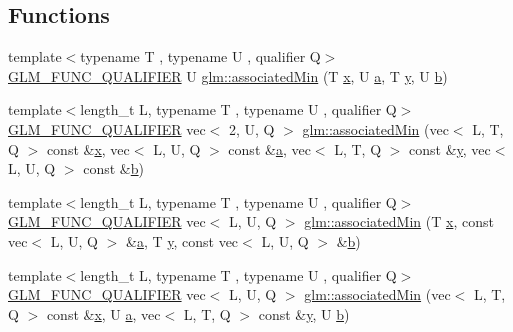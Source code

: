 \subsection*{Functions}
\begin{DoxyCompactItemize}
\item 
{\footnotesize template$<$typename T , typename U , qualifier Q$>$ }\\\hyperlink{setup_8hpp_a33fdea6f91c5f834105f7415e2a64407}{G\+L\+M\+\_\+\+F\+U\+N\+C\+\_\+\+Q\+U\+A\+L\+I\+F\+I\+ER} U \hyperlink{group__gtx__associated__min__max_gacc01bd272359572fc28437ae214a02df}{glm\+::associated\+Min} (T \hyperlink{_s_d_l__opengl_8h_ad0e63d0edcdbd3d79554076bf309fd47}{x}, U \hyperlink{_s_d_l__opengl__glext_8h_a3309789fc188587d666cda5ece79cf82}{a}, T \hyperlink{_s_d_l__opengl_8h_a1675d9d7bb68e1657ff028643b4037e3}{y}, U \hyperlink{_s_d_l__opengl__glext_8h_a0f71581a41fd2264c8944126dabbd010}{b})
\item 
{\footnotesize template$<$length\+\_\+t L, typename T , typename U , qualifier Q$>$ }\\\hyperlink{setup_8hpp_a33fdea6f91c5f834105f7415e2a64407}{G\+L\+M\+\_\+\+F\+U\+N\+C\+\_\+\+Q\+U\+A\+L\+I\+F\+I\+ER} vec$<$ 2, U, Q $>$ \hyperlink{group__gtx__associated__min__max_gac2f0dff90948f2e44386a5eafd941d1c}{glm\+::associated\+Min} (vec$<$ L, T, Q $>$ const \&\hyperlink{_s_d_l__opengl_8h_ad0e63d0edcdbd3d79554076bf309fd47}{x}, vec$<$ L, U, Q $>$ const \&\hyperlink{_s_d_l__opengl__glext_8h_a3309789fc188587d666cda5ece79cf82}{a}, vec$<$ L, T, Q $>$ const \&\hyperlink{_s_d_l__opengl_8h_a1675d9d7bb68e1657ff028643b4037e3}{y}, vec$<$ L, U, Q $>$ const \&\hyperlink{_s_d_l__opengl__glext_8h_a0f71581a41fd2264c8944126dabbd010}{b})
\item 
{\footnotesize template$<$length\+\_\+t L, typename T , typename U , qualifier Q$>$ }\\\hyperlink{setup_8hpp_a33fdea6f91c5f834105f7415e2a64407}{G\+L\+M\+\_\+\+F\+U\+N\+C\+\_\+\+Q\+U\+A\+L\+I\+F\+I\+ER} vec$<$ L, U, Q $>$ \hyperlink{group__gtx__associated__min__max_gacfec519c820331d023ef53a511749319}{glm\+::associated\+Min} (T \hyperlink{_s_d_l__opengl_8h_ad0e63d0edcdbd3d79554076bf309fd47}{x}, const vec$<$ L, U, Q $>$ \&\hyperlink{_s_d_l__opengl__glext_8h_a3309789fc188587d666cda5ece79cf82}{a}, T \hyperlink{_s_d_l__opengl_8h_a1675d9d7bb68e1657ff028643b4037e3}{y}, const vec$<$ L, U, Q $>$ \&\hyperlink{_s_d_l__opengl__glext_8h_a0f71581a41fd2264c8944126dabbd010}{b})
\item 
{\footnotesize template$<$length\+\_\+t L, typename T , typename U , qualifier Q$>$ }\\\hyperlink{setup_8hpp_a33fdea6f91c5f834105f7415e2a64407}{G\+L\+M\+\_\+\+F\+U\+N\+C\+\_\+\+Q\+U\+A\+L\+I\+F\+I\+ER} vec$<$ L, U, Q $>$ \hyperlink{group__gtx__associated__min__max_ga4757c7cab2d809124a8525d0a9deeb37}{glm\+::associated\+Min} (vec$<$ L, T, Q $>$ const \&\hyperlink{_s_d_l__opengl_8h_ad0e63d0edcdbd3d79554076bf309fd47}{x}, U \hyperlink{_s_d_l__opengl__glext_8h_a3309789fc188587d666cda5ece79cf82}{a}, vec$<$ L, T, Q $>$ const \&\hyperlink{_s_d_l__opengl_8h_a1675d9d7bb68e1657ff028643b4037e3}{y}, U \hyperlink{_s_d_l__opengl__glext_8h_a0f71581a41fd2264c8944126dabbd010}{b})

\end{DoxyCompactItemize}

